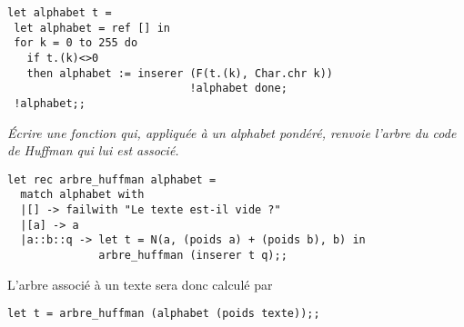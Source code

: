 \begin{Answer}
\begin{lstlisting}
let alphabet t = 
 let alphabet = ref [] in
 for k = 0 to 255 do
   if t.(k)<>0 
   then alphabet := inserer (F(t.(k), Char.chr k)) 
                            !alphabet done;      
 !alphabet;;
\end{lstlisting}
\end{Answer}
\begin{Exercise}[title = Calcul de l'arbre]\it 
Écrire une fonction  qui, appliquée à un alphabet pondéré, renvoie l'arbre du code de Huffman qui lui est associé.
\end{Exercise}
\begin{Answer}
\begin{lstlisting}
let rec arbre_huffman alphabet = 
  match alphabet with
  |[] -> failwith "Le texte est-il vide ?"
  |[a] -> a
  |a::b::q -> let t = N(a, (poids a) + (poids b), b) in
              arbre_huffman (inserer t q);;
\end{lstlisting}
\end{Answer}
\newpage 

L'arbre associé à un texte sera donc calculé par 
\begin{lstlisting}
let t = arbre_huffman (alphabet (poids texte));;
\end{lstlisting}

